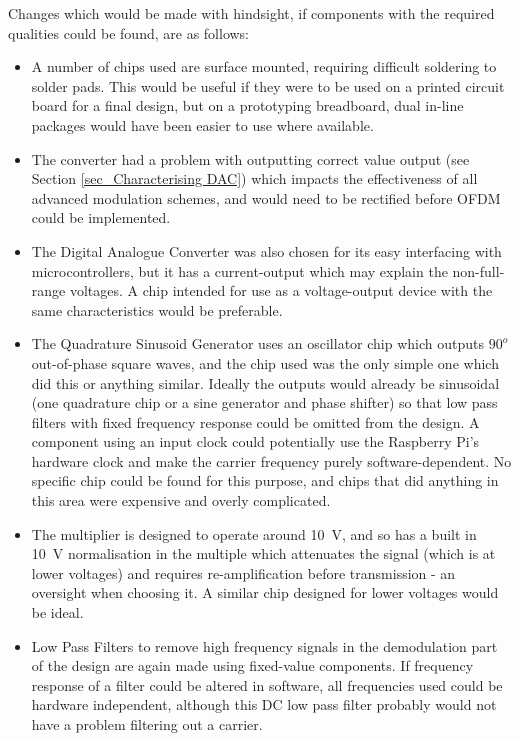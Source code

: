 \documentclass[../main.tex]{subfiles}
\begin{document}
Changes which would be made with hindsight, if components with the required qualities could be found, are as follows:\\

\begin{itemize}
	\item A number of chips used are surface mounted, requiring difficult soldering to solder pads. This would be useful if they were to be used on a printed circuit board for a final design, but on a prototyping breadboard, dual in-line packages would have been easier to use where available.
	\item The converter had a problem with outputting correct value output (see Section \ref{sec_Characterising DAC}) which impacts the effectiveness of all advanced modulation schemes, and would need to be rectified before OFDM could be implemented. 
	\item The Digital Analogue Converter was also chosen for its easy interfacing with microcontrollers, but it has a current-output which may explain the non-full-range voltages. A chip intended for use as a voltage-output device with the same characteristics would be preferable.
	\item The Quadrature Sinusoid Generator uses an oscillator chip which outputs $90^o$ out-of-phase square waves, and the chip used was the only simple one which did this or anything similar. Ideally the outputs would already be sinusoidal (one quadrature chip or a sine generator and phase shifter) so that low pass filters with fixed frequency response could be omitted from the design. A component using an input clock could potentially use the Raspberry Pi's hardware clock and make the carrier frequency purely software-dependent. No specific chip could be found for this purpose, and chips that did anything in this area were expensive and overly complicated.
	\item The multiplier is designed to operate around \SI{10}{\volt}, and so has a built in \SI{10}{\volt} normalisation in the multiple which attenuates the signal (which is at lower voltages) and requires re-amplification before transmission - an oversight when choosing it. A similar chip designed for lower voltages would be ideal.
	\item Low Pass Filters to remove high frequency signals in the demodulation part of the design are again made using fixed-value components. If frequency response of a filter could be altered in software, all frequencies used could be hardware independent, although this DC low pass filter probably would not have a problem filtering out a carrier.
\end{itemize}
\end{document}
